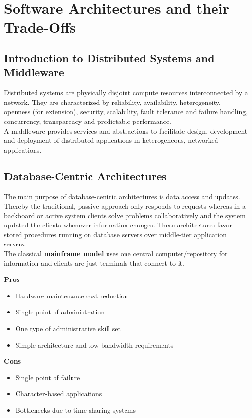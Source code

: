 
\section{Software Architectures and their Trade-Offs}

\subsection{Introduction to Distributed Systems and Middleware}
Distributed systems are physically disjoint compute resources interconnected by a network.
They are characterized by reliability, availability, heterogeneity, openness (for extension), security, scalability, fault tolerance and failure handling, concurrency, transparency and predictable performance.\\
A middleware provides services and abstractions to facilitate design, development and deployment of distributed applications in heterogeneous, networked applications.

\subsection{Database-Centric Architectures}
The main purpose of database-centric architectures is data access and updates.
Thereby the traditional, passive approach only responds to requests whereas in a backboard or active system clients solve problems collaboratively and the system updated the clients whenever information changes.
These architectures favor stored procedures running on database servers over middle-tier application servers.\\

The classical \textbf{mainframe model} uses one central computer/repository for information and clients are just terminals that connect to it.\\
\begin{minipage}[t]{0.49\textwidth}
    \textbf{Pros}
    \begin{itemize}[topsep=0pt,noitemsep]
        \item Hardware maintenance cost reduction
        \item Single point of administration
        \item One type of administrative skill set
        \item Simple architecture and low bandwidth requirements
    \end{itemize}
\end{minipage}
\begin{minipage}[t]{0.49\textwidth}
    \textbf{Cons}
    \begin{itemize}[topsep=0pt, noitemsep]
      \item Single point of failure
      \item Character-based applications
      \item Bottlenecks due to time-sharing systems
    \end{itemize}
\end{minipage}
\vspace{20pt}

